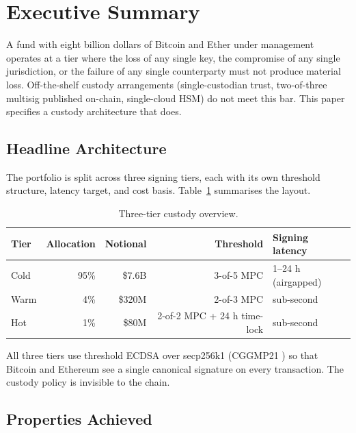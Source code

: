 \section{Executive Summary}

\label{sec:exec}

A fund with eight billion dollars of Bitcoin and Ether under management
operates at a tier where the loss of any single key, the compromise
of any single jurisdiction, or the failure of any single counterparty
must not produce material loss. Off-the-shelf custody arrangements
(single-custodian trust, two-of-three multisig published on-chain,
single-cloud HSM) do not meet this bar. This paper specifies a
custody architecture that does.

\subsection{Headline Architecture}

The portfolio is split across three signing tiers, each with its own
threshold structure, latency target, and cost basis. Table~\ref{tab:overview}
summarises the layout.

\begin{table}[h]
\centering
\small
\begin{tabular}{lrrrl}
\toprule
\textbf{Tier} & \textbf{Allocation} & \textbf{Notional} &
\textbf{Threshold} & \textbf{Signing latency} \\
\midrule
Cold & 95\% & \$7.6B & 3-of-5 MPC & 1--24 h (airgapped) \\
Warm & 4\%  & \$320M  & 2-of-3 MPC & sub-second \\
Hot  & 1\%  & \$80M   & 2-of-2 MPC + 24 h time-lock & sub-second \\
\bottomrule
\end{tabular}
\caption{Three-tier custody overview.}
\label{tab:overview}
\end{table}

All three tiers use threshold ECDSA over secp256k1 (CGGMP21
\cite{cggmp21}) so that Bitcoin and Ethereum see a single canonical
signature on every transaction. The custody policy is invisible to
the chain.

\subsection{Properties Achieved}

